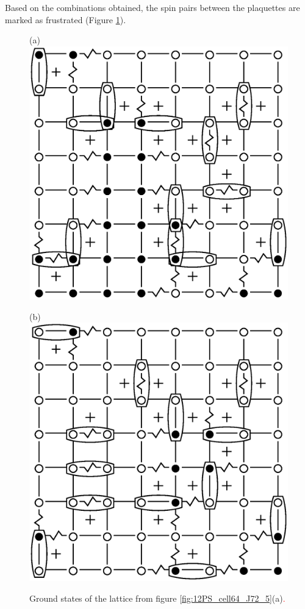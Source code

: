 \documentclass[preprint,12pt]{elsarticle}
\begin{document}
	Based on the combinations obtained, the spin pairs between the plaquettes are marked as frustrated (Figure \ref{fig:12F_cell64_J72_5}).
	
	\begin{figure}[H]
		\centering
		\begin{minipage}[h]{0.3\linewidth}
			\centering(a)
			\includegraphics[width=1\linewidth]{pictures/1Conf_cell64_J72_5.eps}
		\end{minipage}
		\hspace{15pt}
		\begin{minipage}[h]{0.3\linewidth}
			\centering(b)
			\includegraphics[width=1\linewidth]{pictures/2Conf_cell64_J72_5.eps}
		\end{minipage}
		\caption{Ground states of the lattice from figure \ref{fig:12PS_cell64_J72_5}(a)\textcolor{red}{.}}
		\label{fig:12F_cell64_J72_5}
	\end{figure}
	
\end{document}
